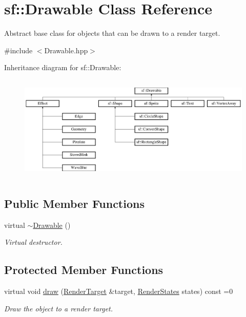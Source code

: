 \hypertarget{classsf_1_1_drawable}{}\section{sf\+:\+:Drawable Class Reference}
\label{classsf_1_1_drawable}


Abstract base class for objects that can be drawn to a render target.  




{\ttfamily \#include $<$Drawable.\+hpp$>$}

Inheritance diagram for sf\+:\+:Drawable\+:\begin{figure}[H]
\begin{center}
\leavevmode
\includegraphics[height=5.104167cm]{classsf_1_1_drawable}
\end{center}
\end{figure}
\subsection*{Public Member Functions}
\begin{DoxyCompactItemize}
\item 
\mbox{\label{classsf_1_1_drawable_a906002f2df7beb5edbddf5bbef96f120}} 
virtual \hyperlink{classsf_1_1_drawable_a906002f2df7beb5edbddf5bbef96f120}{$\sim$\+Drawable} ()
\begin{DoxyCompactList}\small\item\em Virtual destructor. \end{DoxyCompactList}\end{DoxyCompactItemize}
\subsection*{Protected Member Functions}
\begin{DoxyCompactItemize}
\item 
virtual void \hyperlink{classsf_1_1_drawable_a90d2c88bba9b035a0844eccb380ef631}{draw} (\hyperlink{classsf_1_1_render_target}{Render\+Target} \&target, \hyperlink{classsf_1_1_render_states}{Render\+States} states) const =0
\begin{DoxyCompactList}\small\item\em Draw the object to a render target. \end{DoxyCompactList}\end{DoxyCompactItemize}
